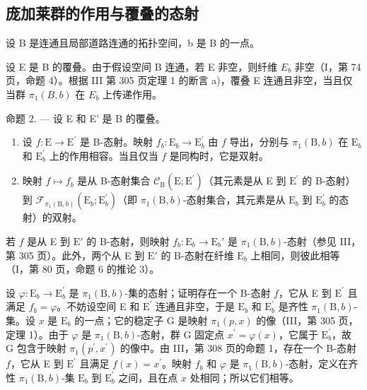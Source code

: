 \subsection{庞加莱群的作用与覆叠的态射}

设 B 是连通且局部道路连通的拓扑空间，b 是 B 的一点。

设 E 是 B 的覆叠。由于假设空间 B 连通，若 E 非空，则纤维 \(E_{b}\) 非空（I，第 74 页，命题 4）。根据 III 第 305 页定理 1 的断言 a)，覆叠 E 连通且非空，当且仅当群 \(\pi_{1}(B,b)\) 在 \(E_{b}\) 上传递作用。

命题 2. --- 设 E 和 E' 是 B 的覆叠。

\begin{enumerate}
\def\labelenumi{\alph{enumi})}
\item
设 \(f\colon\mathrm{E}\to\mathrm{E}^{\prime}\) 是 B-态射。映射 \(f_{b}\colon\mathrm{E}_{b}\to\mathrm{E}_{b}^{\prime}\) 由 \(f\) 导出，分别与 \(\pi_{1}(\mathrm{B},b)\) 在 \(\mathrm{E}_{b}\) 和 \(\mathrm{E}_{b}^{\prime}\) 上的作用相容。当且仅当 \(f\) 是同构时，它是双射。
\item
映射 \(f\mapsto f_{b}\) 是从 B-态射集合 \(\mathcal{C}_{\mathrm{B}}(\mathrm{E};\mathrm{E}^{\prime})\)（其元素是从 E 到 \(\mathrm{E}^{\prime}\) 的 B-态射）到 \(\mathcal{F}_{\pi_1(\mathrm{B},b)}(\mathrm{E}_b;\mathrm{E}_b^{\prime})\)（即 \(\pi_1(\mathrm{B},b)\)-态射集合，其元素是从 \(\mathrm{E}_b\) 到 \(\mathrm{E}_b^{\prime}\) 的态射）的双射。
\end{enumerate}

若 \(f\) 是从 E 到 \(\mathrm{E}'\) 的 B-态射，则映射 \(f_b\colon \mathrm{E}_b\to \mathrm{E}_b'\) 是 \(\pi_1(\mathrm{B},b)\)-态射（参见 III，第 305 页）。此外，两个从 E 到 \(\mathrm{E}'\) 的 B-态射在纤维 \(\mathrm{E}_b\) 上相同，则彼此相等（I，第 80 页，命题 6 的推论 3）。

设 \(\varphi\colon\mathrm{E}_{b}\to\mathrm{E}_{b}^{\prime}\) 是 \(\pi_{1}(\mathrm{B},b)\)-集的态射；证明存在一个 B-态射 \(f\)，它从 E 到 \(\mathrm{E}^{\prime}\) 且满足 \(f_{b}=\varphi\)。不妨设空间 E 和 \(\mathrm{E}^{\prime}\) 连通且非空，于是 \(\mathrm{E}_{b}\) 和 \(\mathrm{E}_{b}^{\prime}\) 是齐性 \(\pi_{1}(\mathrm{B},b)\)-集。设 \(x\) 是 \(\mathrm{E}_{b}\) 的一点；它的稳定子 G 是映射 \(\pi_{1}(p,x)\) 的像（III，第 305 页，定理 1）。由于 \(\varphi\) 是 \(\pi_{1}(\mathrm{B},b)\)-态射，群 G 固定点 \(x^{\prime}=\varphi(x)\)，它属于 \(\mathrm{E}_{b}^{\prime}\)，故 G 包含于映射 \(\pi_{1}(p^{\prime},x^{\prime})\) 的像中。由 III，第 308 页的命题 1，存在一个 B-态射 \(f\)，它从 E 到 \(\mathrm{E}^{\prime}\) 且满足 \(f(x)=x^{\prime}\)。映射 \(f_{b}\) 和 \(\varphi\) 是 \(\pi_{1}(\mathrm{B},b)\)-态射，定义在齐性 \(\pi_{1}(\mathrm{B},b)\)-集 \(\mathrm{E}_{b}\) 到 \(\mathrm{E}_{b}^{\prime}\) 之间，且在点 \(x\) 处相同；所以它们相等。

